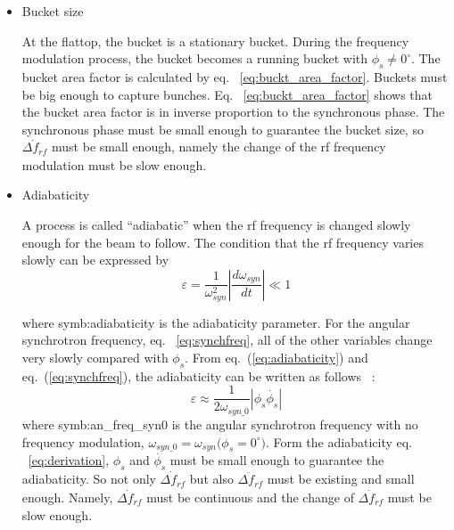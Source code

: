 \begin{itemize}
\item Bucket size

At the flattop, the bucket is a stationary bucket. During the frequency modulation process, the bucket becomes a running bucket with $\phi_{s}\neq 0^\circ$. The bucket area factor is calculated by eq. ~\ref{eq:buckt_area_factor}. Buckets must be big enough to capture bunches. Eq. ~\ref{eq:buckt_area_factor} shows that the bucket area factor is in inverse proportion to the synchronous phase. The synchronous phase must be small enough to guarantee the bucket size, so $\dot{\Delta f_{\mathit{rf}}}$ must be small enough, namely the change of the rf frequency modulation must be slow enough.

\item Adiabaticity 


A process is called “adiabatic” when the rf frequency is changed slowly enough for the beam to follow. The condition that the rf frequency varies slowly can be expressed by 
\begin{equation}
\varepsilon=\frac{1}{\omega_\mathit{syn}^2}|\frac{d\omega_\mathit{syn}}{dt}| \ll 1
\label{eq:adiabaticity}
\end{equation} 

where \gls{symb:adiabaticity} is the adiabaticity parameter. For the angular synchrotron frequency, eq. ~\ref{eq:synchfreq}, all of the other variables change very slowly compared with $\phi_s$. From eq.~(\ref{eq:adiabaticity}) and eq.~(\ref{eq:synchfreq}), the adiabaticity can be written as follows ~\cite{ezura_beam-dynamics_2008}:
\begin{equation}
\varepsilon \approx \frac{1}{2\omega_{\mathit{syn\_0}}}|\phi_s\dot{\phi_{s}}|
\label{eq:derivation}
\end{equation} 
where \gls{symb:an_freq_syn0} is the angular synchrotron frequency with no frequency modulation, $\omega_{\mathit{syn\_0}}=\omega_{\mathit{syn}}({\mathit{\phi_{s}}=0^\circ)}$. Form the adiabaticity eq. ~\ref{eq:derivation}, $\phi_{s}$ and $\dot{\phi_{s}}$ must be small enough to guarantee the adiabaticity. So not only $\dot{\Delta f_{\mathit{rf}}}$ but also $\ddot{\Delta f_{\mathit{rf}}}$ must be existing and small enough. Namely, $\dot{\Delta f_{\mathit{rf}}}$ must be continuous and the change of $\dot{\Delta f_{\mathit{rf}}}$ must be slow enough. 


\end{itemize}
